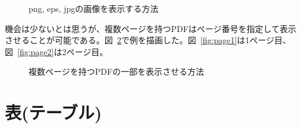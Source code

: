 \documentclass[a4j]{jsarticle}
\begin{document}
\begin{figure}[htbp]
\caption{png, eps, jpgの画像を表示する方法\label{fig:various_img}}
\end{figure}

機会は少ないとは思うが、複数ページを持つPDFはページ番号を指定して表示させることが可能である。図~\ref{fig:multi_page}で例を描画した。図~\ref{fig:page1}は1ページ目、図~\ref{fig:page2}は2ページ目。

\begin{figure}[htbp]
\centering
{}
\hspace{1em}
\caption{複数ページを持つPDFの一部を表示させる方法\label{fig:multi_page}}
\end{figure}

\clearpage

\section{表(テーブル)}
\end{document}

